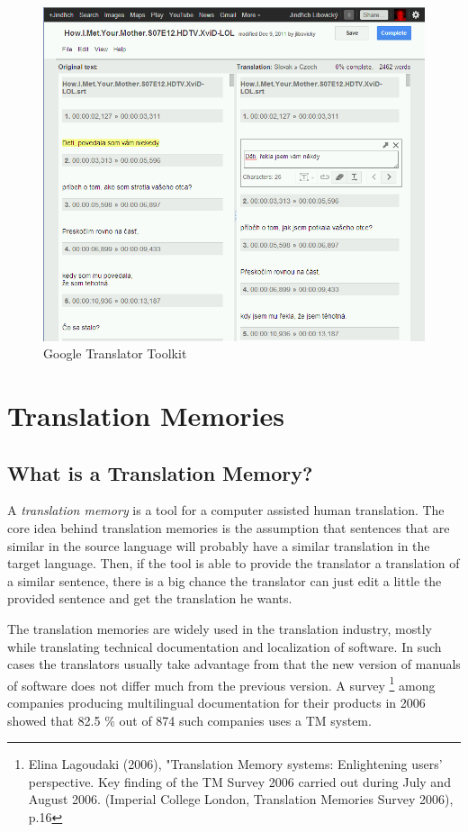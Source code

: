 \begin{figure}

\begin{center}
\includegraphics[scale=0.4]{./figures/google_translator_toolkit.png}
\end{center}

\caption{Google Translator Toolkit} \label{google_translator_toolkit}
\end{figure}

\section{Translation Memories}
\subsection{What is a Translation Memory?}

A \emph{translation memory} is a tool for a computer assisted human translation. The core idea behind translation memories is the assumption that sentences that are similar in the source language will probably have a similar translation in the target language. Then, if the tool is able to provide the translator a translation of a similar sentence, there is a big chance the translator can just edit a little the provided sentence and get the translation he wants.

The translation memories are widely used in the translation industry, mostly while translating technical documentation and localization of software. In such cases the translators usually take advantage from that the new version of manuals of software does not differ much from the previous version. A survey \footnote{Elina Lagoudaki (2006), "Translation Memory systems: Enlightening users' perspective. Key finding of the TM Survey 2006 carried out during July and August 2006. (Imperial College London, Translation Memories Survey 2006), p.16} among companies producing multilingual documentation for their products in 2006 showed that 82.5 \% out of 874 such companies uses a TM system.

